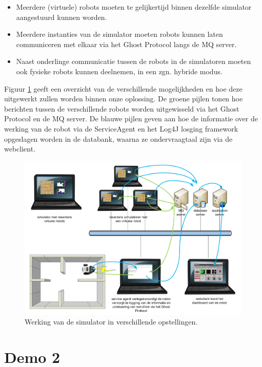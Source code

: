 \documentclass[12pt,a4paper]{report}
\begin{document}
\begin{itemize}
\item Meerdere (virtuele) robots moeten te gelijkertijd binnen dezelfde simulator aangestuurd kunnen worden.
\item Meerdere instanties van de simulator moeten robots kunnen laten communiceren met elkaar via het Ghost Protocol langs de MQ server.
\item Naast onderlinge communicatie tussen de robots in de simulatoren moeten ook fysieke robots kunnen deelnemen, in een zgn. hybride modus.
\end{itemize}

Figuur \ref{fig:simulator-modi} geeft een overzicht van de verschillende mogelijkheden en hoe deze uitgewerkt zullen worden binnen onze oplossing. De groene pijlen tonen hoe berichten tussen de verschillende robots worden uitgewisseld via het Ghost Protocol en de MQ server. De blauwe pijlen geven aan hoe de informatie over de werking van de robot via de ServiceAgent en het Log4J losging framework opgeslagen worden in de databank, waarna ze ondervraagtaal zijn via de webclient.

\begin{figure}[htbp]
  \centering
  \includegraphics[width=200mm, angle=90]{resources/simulator-modi.png}
  \caption{Werking van de simulator in verschillende opstellingen.}
  \label{fig:simulator-modi}
\end{figure}

\section{Demo 2}
\end{document}
